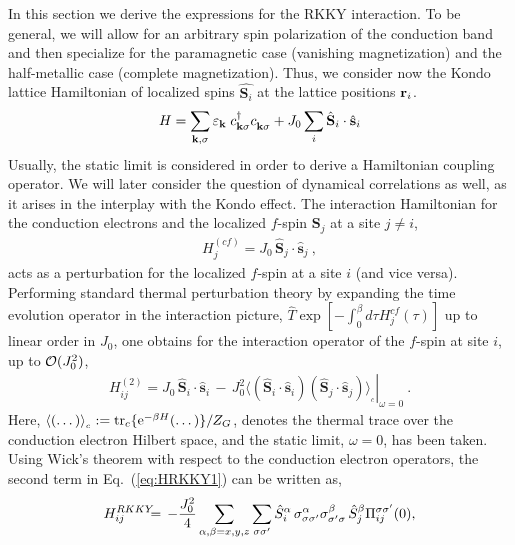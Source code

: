 \documentclass[12pt,twoside]{article}
\newcommand{\ve}[1]{\mathbf{#1}}
\newcommand{\phdagger}{{\phantom{\dagger}}}
\newcommand{\Eq}[1]{Eq.~(\ref{#1})}
\begin{document}
In this section we derive the expressions for the RKKY interaction.
To be general, we will allow for an arbitrary spin polarization of the 
conduction band and then specialize for the paramagnetic case 
(vanishing magnetization) and the half-metallic case (complete
magnetization).  
Thus, we consider now the Kondo lattice Hamiltonian of localized spins 
$\hat{\mathbf{S}_i}$ at the lattice positions ${\bf r}_i$.
\begin{equation}
H = \sum_{{\bf k},\sigma} 
\varepsilon_{\bf k} \; c_{{\bf k} \sigma}^\dagger c_{{\bf k} \sigma}^\phdagger +
J_0 \sum_{i} \hat{{\bf S}}_i \cdot \hat{{\bf s}}_i 
\label{eq:KondoHamiltonian_lattice}
\end{equation}
Usually, the static limit is considered in order to derive a Hamiltonian 
coupling operator. We will later consider the question of 
dynamical correlations as well, as it arises in the interplay with 
the Kondo effect. The interaction Hamiltonian for the conduction 
electrons and the localized $f$-spin $\ve{S}_j$ at a site $j\neq i$, 
\begin{eqnarray}\label{eqn:Hcf}
H^{(cf)}_j=  J_{0}\, \hat{\ve{S}}_{j}\cdot \hat{\ve{s}}_{j} \ ,
\end{eqnarray}
acts as a perturbation for the localized $f$-spin at a site $i$ 
(and vice versa). 
Performing standard thermal perturbation theory by expanding the 
time evolution operator in the interaction picture, 
$\hat T \exp [-\int_0^\beta d\tau H^{cf}_{j}(\tau)]$ up to linear order in $J_0$,
one obtains for the interaction operator of the $f$-spin at site $i$,
up to ${\cal O}(J_0^2)$,  
\begin{eqnarray}\label{eq:HRKKY1}
H^{(2)}_{ij}= J_{0}\, \hat{\ve{S}}_{i}\cdot \hat{\ve{s}}_{i} 
\,-\, J_{0}^2 \left.\langle 
(\hat{\ve{S}}_{i}\cdot \hat{\ve{s}}_{i}) (\hat{\ve{S}}_{j}\cdot \hat{\ve{s}}_{j})
\rangle_{_c}\right|_{\omega=0} \ .
\end{eqnarray}
Here,  $\langle (\dots ) \rangle_{_c} := 
{\rm tr}_c\{{\rm e}^{-\beta H} (\dots ) \}/Z_{G}$, denotes the thermal trace over 
the conduction electron Hilbert space, and the static limit, $\omega=0$, 
has been taken. 
Using Wick's theorem with respect to the conduction electron operators, 
the second term in \Eq{eq:HRKKY1} can be written as,
\begin{eqnarray}\label{eq:HRKKY2}
H^{RKKY}_{ij} \hspace*{-0.2cm}&=&\hspace*{-0.2cm} - \frac{J_{0}^2}{4} \sum_{\alpha,\beta = x,y,z}\sum_{\sigma\sigma'}  
\hat{S}_{i}^{\alpha}\, 
\sigma^{\alpha}_{\sigma\sigma'}\sigma^{\beta}_{\sigma'\sigma}\, 
\hat{S}_{j}^{\beta}  \Pi_{ij}^{\sigma\sigma'}(0),\nonumber\\ &&
\end{eqnarray}
\end{document}
